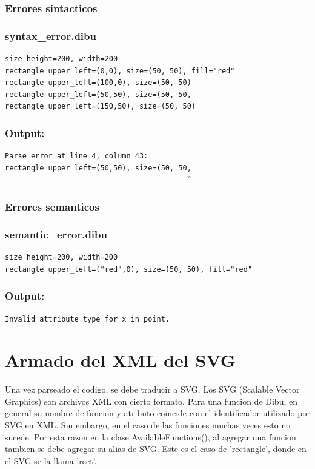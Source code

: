 \documentclass{article}
\theoremstyle{definition}
\theoremstyle{remark}
\begin{document}
\subsubsection{Errores sintacticos}

\subsubsection*{syntax\_error.dibu}
\begin{verbatim}
size height=200, width=200
rectangle upper_left=(0,0), size=(50, 50), fill="red"
rectangle upper_left=(100,0), size=(50, 50)
rectangle upper_left=(50,50), size=(50, 50,
rectangle upper_left=(150,50), size=(50, 50)
\end{verbatim}

\subsubsection*{Output:}
\begin{verbatim}
Parse error at line 4, column 43:
rectangle upper_left=(50,50), size=(50, 50,
                                          ^
\end{verbatim}

\subsubsection{Errores semanticos}

\subsubsection*{semantic\_error.dibu}
\begin{verbatim}
size height=200, width=200
rectangle upper_left=("red",0), size=(50, 50), fill="red"
\end{verbatim}

\subsubsection*{Output:}
\begin{verbatim}
Invalid attribute type for x in point.
\end{verbatim}


\section{Armado del XML del SVG}

Una vez parseado el codigo, se debe traducir a SVG. Los SVG (Scalable Vector Graphics) son archivos XML con cierto formato. Para una funcion de Dibu, en general su nombre de funcion y atributo coincide con el identificador utilizado por SVG en XML. Sin embargo, en el caso de las funciones muchas veces esto no sucede. Por esta razon en la clase AvailableFunctions(), al agregar una funcion tambien se debe agregar su alias de SVG. Este es el caso de 'rectangle', donde en el SVG se la llama 'rect'.
\end{document}
